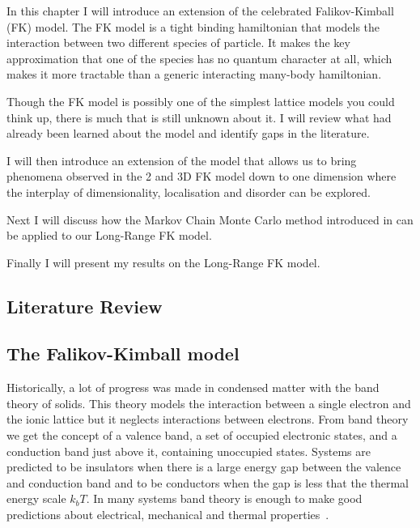 In this chapter I will introduce an extension of the celebrated Falikov-Kimball (FK) model. The FK model is a tight binding hamiltonian that models the interaction between two different species of particle. It makes the key approximation that one of the species has no quantum character at all, which makes it more tractable than a generic interacting many-body hamiltonian.

Though the FK model is possibly one of the simplest lattice models you could think up, there is much that is still unknown about it. I will review what had already been learned about the model and identify gaps in the literature.

I will then introduce an extension of the model that allows us to bring phenomena observed in the 2 and 3D FK model down to one dimension where the interplay of dimensionality, localisation and disorder can be explored.

Next I will discuss how the Markov Chain Monte Carlo method introduced in can be applied to our Long-Range FK model.

Finally I will present my results on the Long-Range FK model.

\hypertarget{literature-review}{%
\subsection{Literature Review}\label{literature-review}}

\hypertarget{the-falikov-kimball-model-1}{%
\subsection{The Falikov-Kimball model}\label{the-falikov-kimball-model-1}}

Historically, a lot of progress was made in condensed matter with the band theory of solids. This theory models the interaction between a single electron and the ionic lattice but it neglects interactions between electrons. From band theory we get the concept of a valence band, a set of occupied electronic states, and a conduction band just above it, containing unoccupied states. Systems are predicted to be insulators when there is a large energy gap between the valence and conduction band and to be conductors when the gap is less that the thermal energy scale \(k_bT\). In many systems band theory is enough to make good predictions about electrical, mechanical and thermal properties~\autocite{neilw.ashcroftSolidStatePhysics1976}.

